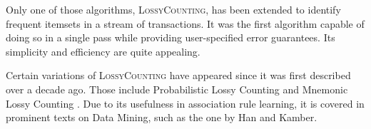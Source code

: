 \documentclass[landscape,twocolumn,a4paper]{article}
\begin{document}
Only one of those algorithms, \textsc{LossyCounting}, has been extended to identify frequent itemsets in a stream of transactions. It was the first algorithm capable of doing so in a single pass while providing user-specified error guarantees. Its simplicity and efficiency are quite appealing. 

Certain variations of \textsc{LossyCounting} have appeared since it was first described over a decade ago. Those include Probabilistic Lossy Counting \citep{dimitropoulos2008probabilistic} and Mnemonic Lossy Counting \citep{rong2010mnemonic}. Due to its usefulness in association rule learning, it is covered in prominent texts on Data Mining, such as the one by Han and Kamber.



\end{document}
